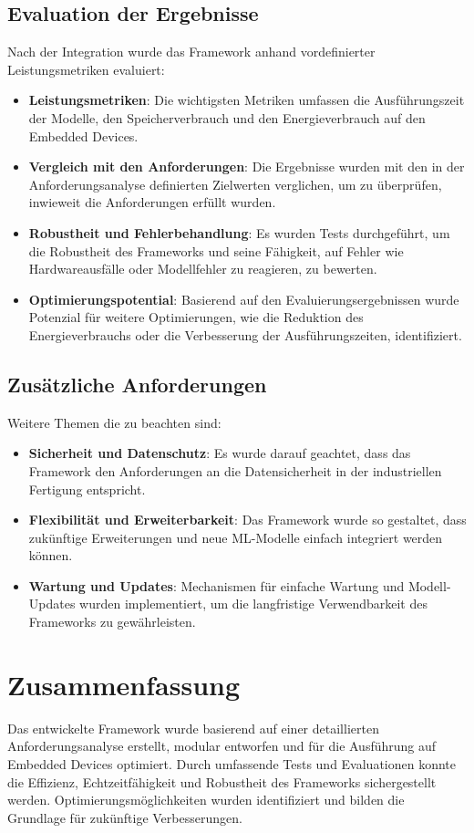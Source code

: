 \subsection{Evaluation der Ergebnisse}
Nach der Integration wurde das Framework anhand vordefinierter Leistungsmetriken evaluiert:

\begin{itemize}
    \item \textbf{Leistungsmetriken}: Die wichtigsten Metriken umfassen die Ausführungszeit der Modelle, den Speicherverbrauch und den Energieverbrauch 
    auf den Embedded Devices.
    \item \textbf{Vergleich mit den Anforderungen}: Die Ergebnisse wurden mit den in der Anforderungsanalyse definierten Zielwerten verglichen, um zu überprüfen, 
    inwieweit die Anforderungen erfüllt wurden.
    \item \textbf{Robustheit und Fehlerbehandlung}: Es wurden Tests durchgeführt, um die Robustheit des Frameworks und seine Fähigkeit, auf Fehler wie 
    Hardwareausfälle oder Modellfehler zu reagieren, zu bewerten.
    \item \textbf{Optimierungspotential}: Basierend auf den Evaluierungsergebnissen wurde Potenzial für weitere Optimierungen, wie die Reduktion des 
    Energieverbrauchs oder die Verbesserung der Ausführungszeiten, identifiziert.
\end{itemize}

\subsection{Zusätzliche Anforderungen}
Weitere Themen die zu beachten sind:

\begin{itemize}
    \item \textbf{Sicherheit und Datenschutz}: Es wurde darauf geachtet, dass das Framework den Anforderungen an die Datensicherheit in der industriellen 
    Fertigung entspricht.
    \item \textbf{Flexibilität und Erweiterbarkeit}: Das Framework wurde so gestaltet, dass zukünftige Erweiterungen und neue ML-Modelle einfach integriert werden können.
    \item \textbf{Wartung und Updates}: Mechanismen für einfache Wartung und Modell-Updates wurden implementiert, um die langfristige Verwendbarkeit 
    des Frameworks zu gewährleisten.
\end{itemize}

\section{Zusammenfassung}
Das entwickelte Framework wurde basierend auf einer detaillierten Anforderungsanalyse erstellt, modular entworfen und für die Ausführung auf 
Embedded Devices optimiert. Durch umfassende Tests und Evaluationen konnte die Effizienz, Echtzeitfähigkeit und Robustheit des Frameworks sichergestellt werden. 
Optimierungsmöglichkeiten wurden identifiziert und bilden die Grundlage für zukünftige Verbesserungen.